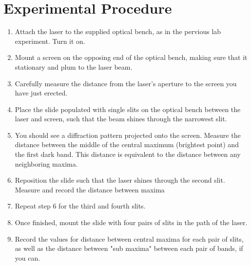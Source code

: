 \documentclass[double]{amsart}
\begin{document}
\section{Experimental Procedure}
\begin{enumerate}
\item Attach the laser to the supplied optical bench, as in the pervious lab experiment. Turn it on. 
\item Mount a screen on the opposing end of the optical bench, making sure that it stationary and plum to the laser beam. 
\item Carefully measure the distance from the laser's aperture to the screen you have just erected. 
\item Place the slide populated with single slits on the optical bench between the laser and screen, such that the beam shines through the narrowest slit.
\item You should see a diffraction pattern projected onto the screen. Measure the distance between the middle of the central maximum (brightest point) and the first dark band. This distance is equivalent to the distance between any neighboring maxima. 
\item Reposition the slide such that the laser shines through the second slit. Measure and record the distance between maxima
\item Repeat step 6 for the third and fourth slits. 
\item Once finished, mount the slide with four pairs of slits in the path of the laser. 
\item Record the values for distance between central maxima for each pair of slits, as well as the distance between "sub maxima" between each pair of bands, if you can. 
\end{enumerate}
\end{document}
